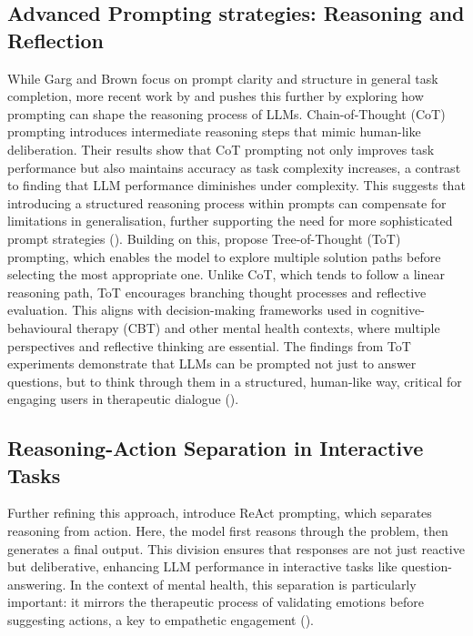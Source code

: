\subsection{Advanced Prompting strategies: Reasoning and Reflection} 
While Garg and Brown focus on prompt clarity and structure in general task completion, more recent work by \cite{wang2022self} and \cite{yao2023tree} pushes this further by exploring how prompting can shape the reasoning process of LLMs. \cite{wang2022self} Chain-of-Thought (CoT) prompting introduces intermediate reasoning steps that mimic human-like deliberation. Their results show that CoT prompting not only improves task performance but also maintains accuracy as task complexity increases, a contrast to \cite{garg2021transformers} finding that LLM performance diminishes under complexity. This suggests that introducing a structured reasoning process within prompts can compensate for limitations in generalisation, further supporting the need for more sophisticated prompt strategies (\cite{wang2022self}).
Building on this, \cite{yao2023tree} propose Tree-of-Thought (ToT) prompting, which enables the model to explore multiple solution paths before selecting the most appropriate one. Unlike CoT, which tends to follow a linear reasoning path, ToT encourages branching thought processes and reflective evaluation. This aligns with decision-making frameworks used in cognitive-behavioural therapy (CBT) and other mental health contexts, where multiple perspectives and reflective thinking are essential. The findings from ToT experiments demonstrate that LLMs can be prompted not just to answer questions, but to think through them in a structured, human-like way, critical for engaging users in therapeutic dialogue (\cite{yao2023tree}).

\subsection{Reasoning-Action Separation in Interactive Tasks} 
Further refining this approach, \cite{yao2022react} introduce ReAct prompting, which separates reasoning from action. Here, the model first reasons through the problem, then generates a final output. This division ensures that responses are not just reactive but deliberative, enhancing LLM performance in interactive tasks like question-answering. In the context of mental health, this separation is particularly important: it mirrors the therapeutic process of validating emotions before suggesting actions, a key to empathetic engagement (\cite{yao2022react}).

